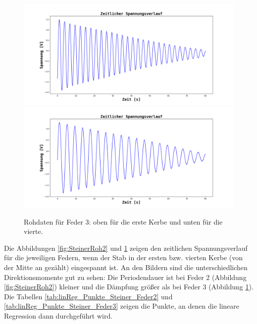\documentclass[12pt,a4paper]{article}
\begin{document}
\begin{figure}
\begin{center}
\includegraphics[scale=0.4]{Bilder/Steiner_Feder3_Kerbe_1_roh.png}
\includegraphics[scale=0.4]{Bilder/Steiner_Feder3_Kerbe_4_roh.png}
\end{center}
\caption{Rohdaten für Feder 3: oben für die erste Kerbe und unten für die vierte.}
\label{fig:SteinerRoh3}
\end{figure}

Die Abbildungen \ref{fig:SteinerRoh2} und \ref{fig:SteinerRoh3} zeigen den zeitlichen Spannungsverlauf für die jeweiligen Federn, wenn der Stab in der ersten bzw. vierten Kerbe (von der Mitte an gezählt) eingespannt ist. An den Bildern sind die unterschiedlichen Direktionsmomente gut zu sehen: Die Periodendauer ist bei Feder 2 (Abbildung \ref{fig:SteinerRoh2}) kleiner und die Dämpfung größer als bei Feder 3 (Abbildung \ref{fig:SteinerRoh3}). \\
Die Tabellen \ref{tab:linReg_Punkte_Steiner_Feder2} und \ref{tab:linReg_Punkte_Steiner_Feder3} zeigen die Punkte, an denen die lineare Regression dann durchgeführt wird.
\end{document}
